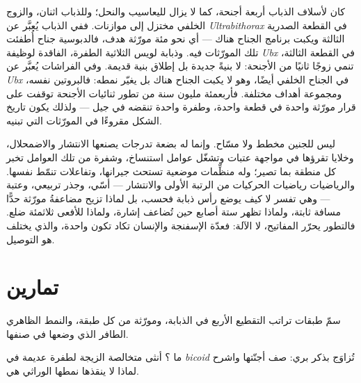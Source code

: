 \begin{example}\label{ex:b3:developmental-genetics:four-wings}
كان لأسلاف الذباب أربعة أجنحة، كما لا يزال لليعاسيب والنحل؛
وللذباب اثنان، والزوج الخلفي مختزل إلى موازنات. ففي الذباب
يُعبَّر عن \emph{Ultrabithorax} في القطعة الصدرية الثالثة
ويكبت برنامج الجناح هناك --- أي نحو مئة مورّثة هدف، فالدبوسية
جناح أُطفئت تلك المورّثات فيه. وذبابة لويس الثلاثية الطفرة،
الفاقدة لوظيفة \emph{Ubx} في القطعة الثالثة، تنمي زوجًا
ثانيًا من الأجنحة: لا بنيةً جديدة بل إطلاق بنية قديمة. وفي
الفراشات يُعبَّر عن \emph{Ubx} في الجناح الخلفي أيضًا، وهو
لا يكبت الجناح هناك بل يغيّر نمطه: فالبروتين نفسه، ومجموعة
أهداف مختلفة. فأربعمئة مليون سنة من تطور ثنائيات الأجنحة
توقفت على قرار مورّثة واحدة في قطعة واحدة، وطفرة واحدة تنقضه
في جيل --- ولذلك يكون تاريخ الشكل مقروءًا في المورّثات التي
تبنيه.
\end{example}

\begin{remark}\label{rem:b3:developmental-genetics:remark}
ليس للجنين مخطط ولا مسّاح. وإنما له بضعة تدرجات يصنعها
الانتشار والاضمحلال، وخلايا تقرؤها في مواجهة عتبات وتشغّل
عوامل استنساخ، وشفرة من تلك العوامل تخبر كل منطقة بما تصير؛
وله منظِّمات موضعية تستحث جيرانها، وتفاعلات تنمّط نفسها.
والرياضيات رياضيات الحركيات من الرتبة الأولى والانتشار ---
أسّي، وجذر تربيعي، وعتبة --- وهي تفسر لا كيف يوضع رأس ذبابة
فحسب، بل لماذا تزيح مضاعفةُ مورّثة حدًّا مسافة ثابتة، ولماذا
تظهر ستة أصابع حين تُضاعف إشارة، ولماذا للأفعى ثلاثمئة ضلع.
فالتطور يحرّر المفاتيح، لا الآلة: فعدّة الإسفنجة والإنسان
تكاد تكون واحدة، والذي يختلف هو التوصيل.
\end{remark}

\section{تمارين}

\begin{exercise}[$\star$]\label{exo:b3:developmental-genetics:1}
سمّ طبقات تراتب التقطيع الأربع في الذبابة، ومورّثة من كل
طبقة، والنمط الظاهري الطافر الذي وضعها في صنفها.
\end{exercise}

\begin{exercise}[$\star$]\label{exo:b3:developmental-genetics:2}
ما ؟ أنثى متخالصة الزيجة لطفرة عديمة في
\emph{bicoid} تُزاوَج بذكر بري: صف أجنّتها واشرح لماذا لا
ينقذها نمطها الوراثي هي.
\end{exercise}

